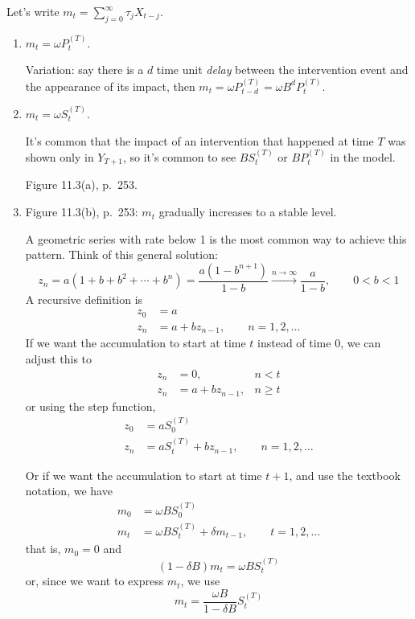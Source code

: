 \documentclass[12pt]{article}
\begin{document}
Let's write $m_t = \sum_{j=0}^\infty \tau_j X_{t-j}$.

\begin{enumerate}
\item $m_t = \omega P_t^{(T)}$.

    Variation: say there is a $d$ time unit \emph{delay} between the
    intervention event and the appearance of its impact, then
    $m_t = \omega P_{t-d}^{(T)} = \omega B^d P_t^{(T)}$.
\item $m_t = \omega S_t^{(T)}$.

    It's common that the impact of an intervention that happened at time
    $T$ was shown only in $Y_{T+1}$,
    so it's common to see
    $BS_{t}^{(T)}$ or $BP_t^{(T)}$ in the model.

    Figure 11.3(a), p.~253.
\item Figure 11.3(b), p.~253: $m_t$ gradually increases to a stable
    level.

    A geometric series with rate below 1 is the most common way to
    achieve this pattern.
    Think of this general solution:
    \begin{equation}\label{eq:geometric}
    z_n
    = a(1 + b + b^2 + \dotsb + b^n)
    = \frac{a(1 - b^{n+1})}{1 - b}
    \xrightarrow{n \rightarrow \infty} \frac{a}{1 - b},
    \qquad 0 < b < 1
    \end{equation}
    A recursive definition is
    \begin{align*}
        z_0 &= a\\
        z_n &= a + bz_{n-1},\qquad n=1,2,\dotsc
    \end{align*}
    If we want the accumulation to start at time $t$ instead of time 0,
    we can adjust this to
    \begin{align*}
        z_n &= 0, \qquad     &n < t\\
        z_n &= a + bz_{n-1}, &n \ge t
    \end{align*}
    or using the step function,
    \begin{align*}
        z_0 &= a S_0^{(T)}\\
        z_n &= a S_{t}^{(T)} + bz_{n-1},\qquad n=1,2,\dotsc
    \end{align*}

    Or if we want the accumulation to start at time $t+1$,
    and use the textbook notation, we have
    \begin{align*}
        m_0 &= \omega BS_{0}^{(T)}\\
        m_t &= \omega BS_{t}^{(T)} + \delta m_{t-1},
            \qquad t=1,2,\dotsc
    \end{align*}
    that is, $m_0 = 0$ and
    \[
        (1 - \delta B)m_t = \omega B S_{t}^{(T)}
    \]
    or, since we want to express \emph{$m_t$}, we use
    \begin{equation}\label{eq:increase-1}
        m_t = \frac{\omega B}{1 - \delta B} S_t^{(T)}
    \end{equation}


\end{enumerate}
\end{document}
